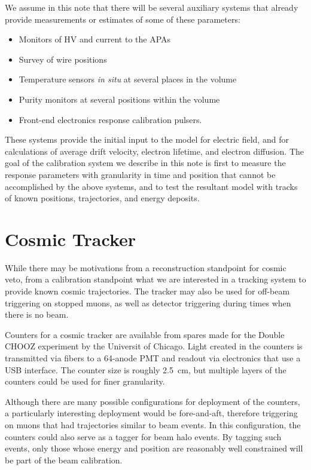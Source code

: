 We assume in this note that there will be
several auxiliary systems that already provide measurements or estimates of
some of these parameters:
\begin{itemize}
\item Monitors of HV and current to the APAs
\item Survey of wire positions
\item Temperature sensors {\it in situ} at several places in the volume
\item Purity monitors at several positions within the volume
\item Front-end electronics response calibration pulsers.
\end{itemize}
        These systems provide the initial input to the model for electric
field, and for calculations of average drift velocity, electron lifetime, and
electron diffusion.  The goal of the calibration system we describe in this
note is first to measure the response parameters with granularity in time and
position that cannot be accomplished by the above systems, and to test the
resultant model with tracks of known positions, trajectories, and energy
deposits.

\section{Cosmic Tracker}

        While there may be motivations from a reconstruction standpoint for
cosmic veto, from a calibration standpoint what we are interested in a tracking
system to provide known cosmic trajectories.  The tracker may also be used for
off-beam triggering on stopped muons, as well as detector triggering during
times when there is no beam.

        Counters for a cosmic tracker are available from spares made for the
Double CHOOZ experiment by the Universit of Chicago. Light created in the
counters is transmitted via fibers to a 64-anode PMT and readout via
electronics that use a USB interface.  The counter size is roughly 2.5~cm, but
multiple layers of the counters could be used for finer granularity.

        Although there are many possible configurations for deployment of the
counters, a particularly interesting deployment would be fore-and-aft,
therefore triggering on muons that had trajectories similar to beam events. In
this configuration, the counters could also serve as a tagger for beam halo
events.  By tagging such events, only those whose energy and position are
reasonably well constrained will be part of the beam calibration.

